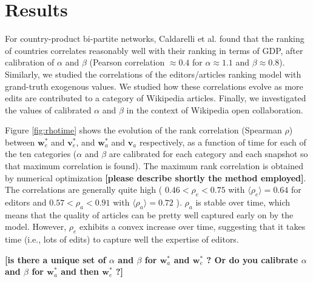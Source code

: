 \section{Results}
For country-product bi-partite networks,  Caldarelli et al. \cite{caldarelli2012network} found that the ranking of countries correlates reasonably well with their ranking in terms of GDP, after calibration of $\alpha$ and $\beta$ (Pearson correlation $\approx 0.4$ for $\alpha \approx 1.1$ and $\beta \approx 0.8$). Similarly, we studied the correlations of the editors/articles ranking model with grand-truth exogenous values. We studied how these correlations evolve as more edits are contributed to a category of Wikipedia articles. Finally, we investigated the values of calibrated $\alpha$ and $\beta$ in the context of Wikipedia open collaboration.

Figure \ref{fig:rhotime} shows the evolution of the rank correlation (Spearman $\rho$) between $\mathbf{w}^*_e$ and $\mathbf{v}^*_e$, and $\mathbf{w}^*_a$ and $\mathbf{v}_a$ respectively, as a function of time for each of the ten categories ($\alpha$ and $\beta$ are calibrated for each category and each snapshot so that maximum correlation is found). The maximum rank correlation is obtained by numerical optimization {\bf [please describe shortly the method employed]}. The correlations are generally quite high ( $ 0.46 < \rho_e < 0.75$ with $\langle \rho_e\rangle = 0.64$ for editors and $0.57 < \rho_a < 0.91$ with $\langle \rho_a\rangle = 0.72$ ). $\rho_{a}$  is stable over time, which means that the quality of articles can be pretty well captured early on by the model. However, $\rho_e$ exhibits a convex increase over time, suggesting that it takes time (i.e., lots of edits) to capture well the expertise of editors.

{\bf [is there a unique set of $\alpha$ and $\beta$ for $\mathbf{w}^*_a$ and $\mathbf{w}^*_e$ ? Or do you calibrate $\alpha$ and $\beta$ for  $\mathbf{w}^*_a$ and then  $\mathbf{w}^*_e$ ?]}

